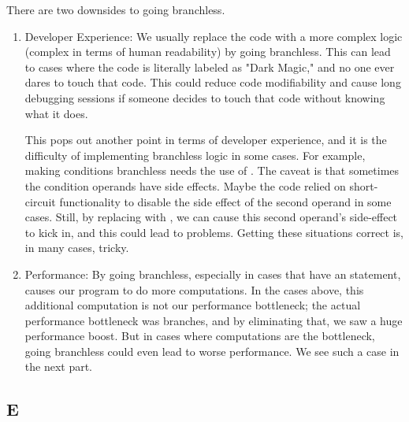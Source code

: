 \documentclass[12pt]{article}
\begin{document}
\begin{itemize}
There are two downsides to going branchless.
\begin{enumerate}
	\item Developer Experience: We usually replace the code with a more complex logic (complex in terms of human readability) by going branchless. This can lead to cases where the code is literally labeled as "Dark Magic," and no one ever dares to touch that code. This could reduce code modifiability and cause long debugging sessions if someone decides to touch that code without knowing what it does.
	
	This pops out another point in terms of developer experience, and it is the difficulty of implementing branchless logic in some cases. For example, making \codeword{||} conditions branchless needs the use of \codeword{|}. The caveat is that sometimes the condition operands have side effects. Maybe the code relied on short-circuit functionality to disable the side effect of the second operand in some cases. Still, by replacing \codeword{||} with \codeword{|}, we can cause this second operand's side-effect to kick in, and this could lead to problems. Getting these situations correct is, in many cases, tricky.
	
	\item Performance: By going branchless, especially in cases that have an  statement, causes our program to do more computations. In the cases above, this additional computation is not our performance bottleneck; the actual performance bottleneck was branches, and by eliminating that, we saw a huge performance boost. But in cases where computations are the bottleneck, going branchless could even lead to worse performance. We see such a case in the next part. 
\end{enumerate}
\end{itemize}
	
	\subsection{E}
	
\end{document}

